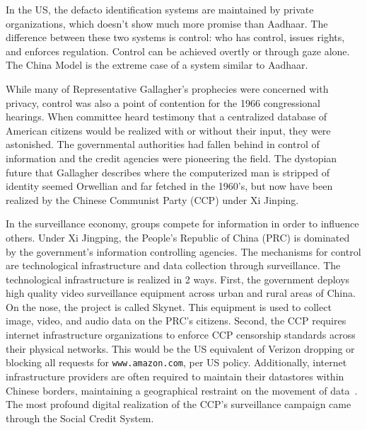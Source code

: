 In the US, the defacto identification systems are maintained by private
organizations, which doesn't show much more promise than Aadhaar. The
difference between these two systems is control: who has control, issues
rights, and enforces regulation. Control can be achieved overtly or
through gaze alone. The China Model is the extreme case of a system similar
to Aadhaar.

While many of Representative Gallagher's prophecies were concerned with
privacy, control was also a point of contention for the 1966 congressional
hearings. When committee heard testimony that a centralized database of
American citizens would be realized with or without their input, they were
astonished. The governmental authorities had fallen behind in control of
information and the credit agencies were pioneering the field. The dystopian
future that Gallagher describes where the computerized man is stripped of
identity seemed Orwellian and far fetched in the 1960's, but now have been
realized by the Chinese Communist Party (CCP) under Xi Jinping.

In the surveillance economy, groups compete for information in order to
influence others. Under Xi Jingping, the People's Republic of China (PRC) is
dominated by the government's information controlling agencies. The mechanisms
for control are technological infrastructure and data collection through
surveillance. The technological infrastructure is realized in 2 ways. First,
the government deploys high quality video surveillance equipment across urban
and rural areas of China. On the nose, the project is called Skynet. This
equipment is used to collect image, video, and audio data on the PRC's
citizens. Second, the CCP requires internet infrastructure organizations to
enforce CCP censorship standards across their physical networks. This would be the
US equivalent of Verizon dropping or blocking all requests for
\texttt{www.amazon.com}, per US policy. Additionally, internet infrastructure providers are
often required to maintain their datastores within Chinese borders, maintaining
a geographical restraint on the movement of data~\cite{qiang2019road}. The most
profound digital realization of the CCP's surveillance campaign came through
the Social Credit System.

